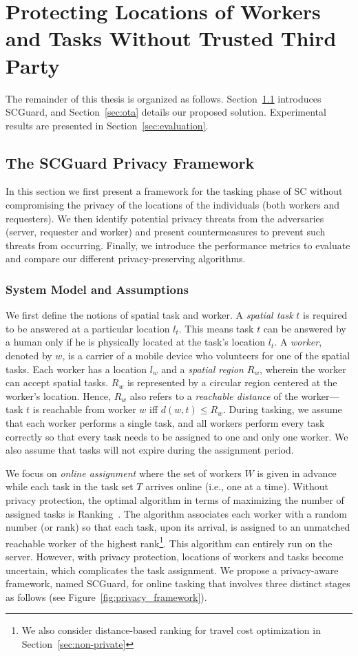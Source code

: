 \documentclass{USC-Thesis}
\newcommand{\SCG}{{SCGuard}}
\numberwithin{equation}{chapter}
\begin{document}
\section{Protecting Locations of Workers and Tasks Without Trusted Third Party}
The remainder of this thesis is organized as follows.
Section~\ref{sec:framework} introduces \SCG, and Section~\ref{sec:ota} details our proposed solution. Experimental results are presented in Section~\ref{sec:evaluation}.

\subsection{The SCGuard Privacy Framework}
\label{sec:framework}
In this section we first present a framework for the tasking phase of SC without compromising the privacy of the locations of the individuals (both workers and requesters).
We then identify potential privacy threats from the adversaries (server, requester and worker) and present countermeasures to prevent such threats from occurring.
Finally, we introduce the performance metrics to evaluate and compare our different privacy-preserving algorithms.

\subsubsection{System Model and Assumptions}
\label{sec:system2} 
We first define the notions of spatial task and worker. A \emph{spatial task} $t$ is required to be answered at a particular location $l_t$. This means task $t$ can be answered by a human only if he is physically located at the task's location $l_t$.
A \emph{worker}, denoted by $w$, is a carrier of a mobile device who volunteers for one of the spatial tasks.
Each worker has a location $l_w$ and a \emph{spatial region} $R_w$, wherein the worker can accept spatial tasks. $R_w$ is represented by a circular region centered at the worker's location. Hence, $R_w$ also refers to a \emph{reachable distance} of the worker---task $t$ is reachable from worker $w$ iff $\mathit{d(w,t)\le R_w}$. During tasking, we assume that each worker performs a single task, and all workers perform every task correctly so that every task needs to be assigned to one and only one worker. We also assume that tasks will not expire during the assignment period.

We focus on \emph{online assignment} where the set of workers $W$ is given in advance while each task in the task set $T$ arrives online (i.e., one at a time). Without privacy protection, the optimal algorithm in terms of maximizing the number of assigned tasks is Ranking~\cite{karp1990optimal}. The algorithm associates each worker with a random number (or rank) so that each task, upon its arrival, is assigned to an unmatched reachable worker of the highest rank\footnote{We also consider distance-based ranking for travel cost optimization in Section~\ref{sec:non-private}}. This algorithm can entirely run on the server. However, with privacy protection, locations of workers and tasks become uncertain, which complicates the task assignment. We propose a privacy-aware framework, named \SCG, for online tasking that involves three distinct stages as follows (see Figure~\ref{fig:privacy_framework}).
\end{document}

